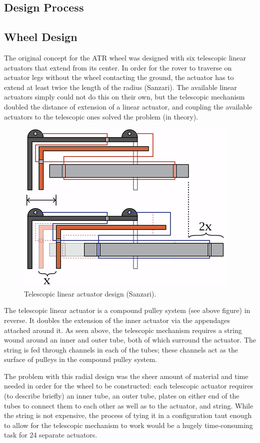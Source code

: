 \documentclass[12pt]{article}
\numberwithin{figure}{section}
\begin{document}
\begin{multicols}{2}
\section{Design Process}
\subsection{Wheel Design}
The original concept for the ATR wheel was designed with six telescopic linear actuators that extend from its center. In order for the rover to traverse on actuator legs without the wheel contacting the ground, the actuator has to extend at least twice the length of the radius (Sanzari). The available linear actuators simply could not do this on their own, but the telescopic mechanism doubled the distance of extension of a linear actuator, and coupling the available actuators to the telescopic ones solved the problem (in theory).

\begin{figure}[H]
\includegraphics[scale=0.5]{Telescopic_Mechanism.png}
\caption{Telescopic linear actuator design (Sanzari).}
\label{fig:telescopic-actuator-design}
\end{figure}

The telescopic linear actuator is a compound pulley system (see above figure) in reverse. It doubles the extension of the inner actuator via the appendages attached around it. As seen above, the telescopic mechanism requires a string wound around an inner and outer tube, both of which surround the actuator. The string is fed through channels in each of the tubes; these channels act as the surface of pulleys in the compound pulley system.

The problem with this radial design was the sheer amount of material and time needed in order for the wheel to be constructed: each telescopic actuator requires (to describe briefly) an inner tube, an outer tube, plates on either end of the tubes to connect them to each other as well as to the actuator, and string. While the string is not expensive, the process of tying it in a configuration taut enough to allow for the telescopic mechanism to work would be a hugely time-consuming task for 24 separate actuators.


\end{multicols}
\end{document}
